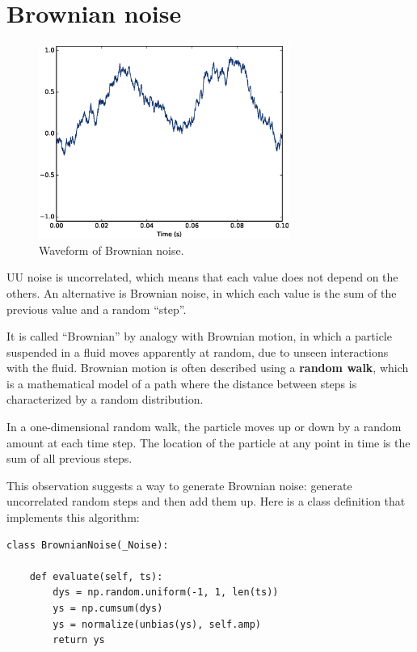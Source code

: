 \documentclass[12pt]{book}
\begin{document}
\section{Brownian noise}
\label{brownian}

\begin{figure}
\centerline{\includegraphics[height=2.5in]{figs/rednoise0.eps}}
\caption{Waveform of Brownian noise.}
\label{fig.rednoise0}
\end{figure}

UU noise is uncorrelated, which means that each value does not depend
on the others.  An alternative is Brownian noise, in which each value
is the sum of the previous value and a random ``step''.

It is called ``Brownian'' by analogy with Brownian motion, in which a
particle suspended in a fluid moves apparently at random, due to
unseen interactions with the fluid.  Brownian motion is often
described using a {\bf random walk}, which is a mathematical model 
of a path where the distance between steps is characterized by a
random distribution.

In a one-dimensional random walk, the particle moves up or down
by a random amount at each time step.  The location of the particle
at any point in time is the sum of all previous steps.

This observation suggests a way to generate Brownian noise:
generate uncorrelated random steps and then add them up.
Here is a class definition that implements this algorithm:

\begin{verbatim}
class BrownianNoise(_Noise):

    def evaluate(self, ts):
        dys = np.random.uniform(-1, 1, len(ts))
        ys = np.cumsum(dys)
        ys = normalize(unbias(ys), self.amp)
        return ys
\end{verbatim}
\end{document}
